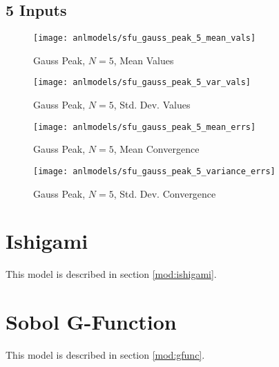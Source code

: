\subsection{5 Inputs}
\begin{figure}[H]
  \centering
  \texttt{[image: anlmodels/sfu\_gauss\_peak\_5\_mean\_vals]}
  \caption{Gauss Peak, $N=5$, Mean Values}
  \label{fig:gauss peak mean values 5}
\end{figure}
\begin{figure}[H]
  \centering
  \texttt{[image: anlmodels/sfu\_gauss\_peak\_5\_var\_vals]}
  \caption{Gauss Peak, $N=5$, Std. Dev. Values}
  \label{fig:gauss peak var values 5}
\end{figure}

\begin{figure}[H]
  \centering
  \texttt{[image: anlmodels/sfu\_gauss\_peak\_5\_mean\_errs]}
  \caption{Gauss Peak, $N=5$, Mean Convergence}
  \label{fig:gauss peak mean errors 5}
\end{figure}
\begin{figure}[H]
  \centering
  \texttt{[image: anlmodels/sfu\_gauss\_peak\_5\_variance\_errs]}
  \caption{Gauss Peak, $N=5$, Std. Dev. Convergence}
  \label{fig:gauss peak var errors 5}
\end{figure}




\section{Ishigami}
This model is described in section \ref{mod:ishigami}.

\section{Sobol G-Function}
This model is described in section \ref{mod:gfunc}.

